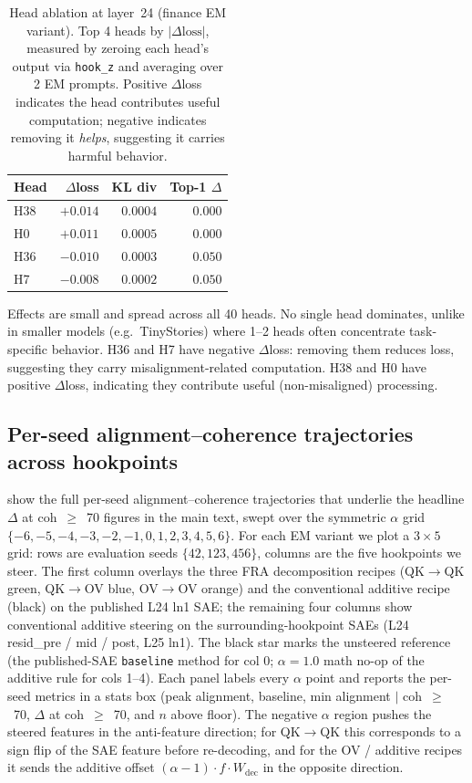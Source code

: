 \documentclass{article}
\theoremstyle{plain}
\theoremstyle{definition}
\theoremstyle{remark}
\begin{document}
\begin{table}[h]
\caption{Head ablation at layer~24 (finance EM variant). Top 4 heads by $|\Delta\text{loss}|$, measured by zeroing each head's output via \texttt{hook\_z} and averaging over 2 EM prompts. Positive $\Delta$loss indicates the head contributes useful computation; negative indicates removing it \emph{helps}, suggesting it carries harmful behavior.}
\label{tab:head_ablation}
\centering
\begin{tabular}{lrrr}
\toprule
Head & $\Delta$loss & KL div & Top-1 $\Delta$ \\
\midrule
H38 & $+0.014$ & $0.0004$ & $0.000$ \\
H0  & $+0.011$ & $0.0005$ & $0.000$ \\
H36 & $-0.010$ & $0.0003$ & $0.050$ \\
H7  & $-0.008$ & $0.0002$ & $0.050$ \\
\bottomrule
\end{tabular}
\end{table}

Effects are small and spread across all 40 heads. No single head dominates, unlike in smaller models (e.g.\ TinyStories) where 1--2 heads often concentrate task-specific behavior. H36 and H7 have negative $\Delta$loss: removing them reduces loss, suggesting they carry misalignment-related computation. H38 and H0 have positive $\Delta$loss, indicating they contribute useful (non-misaligned) processing.

\subsection{Per-seed alignment--coherence trajectories across hookpoints}\label{app:seed_grid}

 show the full per-seed alignment--coherence trajectories that underlie the headline $\Delta$ at coh~$\geq$~70 figures in the main text, swept over the symmetric $\alpha$ grid $\{-6, -5, -4, -3, -2, -1, 0, 1, 2, 3, 4, 5, 6\}$. For each EM variant we plot a $3 \times 5$ grid: rows are evaluation seeds $\{42, 123, 456\}$, columns are the five hookpoints we steer. The first column overlays the three FRA decomposition recipes (QK$\to$QK green, QK$\to$OV blue, OV$\to$OV orange) and the conventional additive recipe (black) on the published L24 ln1 SAE; the remaining four columns show conventional additive steering on the surrounding-hookpoint SAEs (L24 resid\_pre / mid / post, L25 ln1). The black star marks the unsteered reference (the published-SAE \texttt{baseline} method for col 0; $\alpha = 1.0$ math no-op of the additive rule for cols 1--4). Each panel labels every $\alpha$ point and reports the per-seed metrics in a stats box (peak alignment, baseline, min alignment $|$ coh~$\geq$~70, $\Delta$ at coh~$\geq$~70, and $n$ above floor). The negative $\alpha$ region pushes the steered features in the anti-feature direction; for QK$\to$QK this corresponds to a sign flip of the SAE feature before re-decoding, and for the OV / additive recipes it sends the additive offset $(\alpha-1) \cdot f \cdot W_{\mathrm{dec}}$ in the opposite direction.
\end{document}
